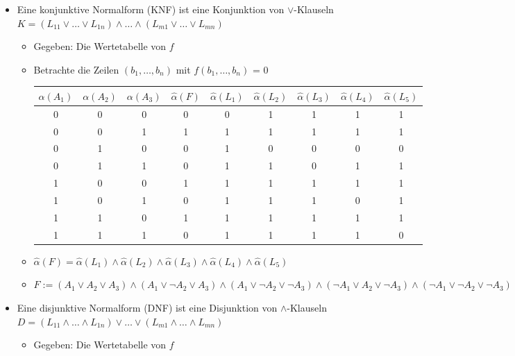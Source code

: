 \documentclass{scrartcl}
\begin{document}
\begin{itemize}
	\item Eine konjunktive Normalform (KNF) ist eine Konjunktion von $\vee$-Klauseln \\
	$K = (L_{11} \vee \ldots \vee L_{1n}) \wedge \ldots \wedge (L_{m1} \vee \ldots \vee L_{mn})$
	\begin{itemize}
		\item Gegeben: Die Wertetabelle von $f$
		\item Betrachte die Zeilen $(b_1, \ldots, b_n)$ mit $f(b_1, \ldots, b_n)$ = 0 \\
		\begin{tabular}{|c|c|c|c|c|c|c|c|c|}
		\hline 
		$\alpha(A_1)$ & $\alpha(A_2)$ & $\alpha(A_3)$ & $\widehat{\alpha}(F)$ & $\widehat{\alpha}(L_1)$ & $\widehat{\alpha}(L_2)$ & $\widehat{\alpha}(L_3)$ & $\widehat{\alpha}(L_4)$ & $\widehat{\alpha}(L_5)$ \\ 
		\hline 
		0 & 0 & 0 & 0 & 0 & 1 & 1 & 1 & 1 \\ 
		\hline 
		0 & 0 & 1 & 1 & 1 & 1 & 1 & 1 & 1 \\ 
		\hline 
		0 & 1 & 0 & 0 & 1 & 0 & 0 & 0 & 0 \\ 
		\hline 
		0 & 1 & 1 & 0 & 1 & 1 & 0 & 1 & 1 \\ 
		\hline 
		1 & 0 & 0 & 1 & 1 & 1 & 1 & 1 & 1 \\ 
		\hline 
		1 & 0 & 1 & 0 & 1 & 1 & 1 & 0 & 1 \\ 
		\hline 
		1 & 1 & 0 & 1 & 1 & 1 & 1 & 1 & 1 \\ 
		\hline 
		1 & 1 & 1 & 0 & 1 & 1 & 1 & 1 & 0 \\ 
		\hline 
		\end{tabular}
		\item $\widehat{\alpha}(F) = \widehat{\alpha}(L_1) \wedge \widehat{\alpha}(L_2) \wedge \widehat{\alpha}(L_3) \wedge \widehat{\alpha}(L_4) \wedge \widehat{\alpha}(L_5)$
		\item $F := (A_1 \vee A_2 \vee A_3) \wedge (A_1 \vee \neg A_2 \vee A_3) \wedge (A_1 \vee \neg A_2 \vee \neg A_3) \wedge (\neg A_1 \vee A_2 \vee \neg A_3) \wedge (\neg A_1 \vee \neg A_2 \vee \neg A_3)$
	\end{itemize}
	\item Eine disjunktive Normalform (DNF) ist eine Disjunktion von $\wedge$-Klauseln \\
	$D = (L_{11} \wedge \ldots \wedge L_{1n}) \vee \ldots \vee (L_{m1} \wedge \ldots \wedge L_{mn})$
	\begin{itemize}
		\item Gegeben: Die Wertetabelle von $f$

\end{itemize}
\end{itemize}
\end{document}
